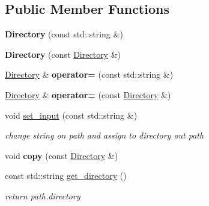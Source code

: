 \subsection*{Public Member Functions}
\begin{DoxyCompactItemize}
\item 
\mbox{\label{class_directory_a672adf44186f0a5b859681b858199060}} 
{\bfseries Directory} (const std\+::string \&)
\item 
\mbox{\label{class_directory_a1e6c830b4852be463ee627eaf2f4851e}} 
{\bfseries Directory} (const \mbox{\hyperlink{class_directory}{Directory}} \&)
\item 
\mbox{\label{class_directory_aa34f63559f0f4df446619cc3f8feeb4a}} 
\mbox{\hyperlink{class_directory}{Directory}} \& {\bfseries operator=} (const std\+::string \&)
\item 
\mbox{\label{class_directory_a83d6fc87791ff52071eabb7fd72c24fb}} 
\mbox{\hyperlink{class_directory}{Directory}} \& {\bfseries operator=} (const \mbox{\hyperlink{class_directory}{Directory}} \&)
\item 
\mbox{\label{class_directory_ad219c1eb86a1359c28e7fbfe34c45232}} 
void \mbox{\hyperlink{class_directory_ad219c1eb86a1359c28e7fbfe34c45232}{set\+\_\+input}} (const std\+::string \&)
\begin{DoxyCompactList}\small\item\em change string on path and assign to directory out path \end{DoxyCompactList}\item 
\mbox{\label{class_directory_a4cb94f24bee78cd0c1e50bad3f773b74}} 
void {\bfseries copy} (const \mbox{\hyperlink{class_directory}{Directory}} \&)
\item 
\mbox{\label{class_directory_a4c4d39af239f886cbbebae40b86d87db}} 
const std\+::string \mbox{\hyperlink{class_directory_a4c4d39af239f886cbbebae40b86d87db}{get\+\_\+directory}} ()
\begin{DoxyCompactList}\small\item\em return path.\+directory \end{DoxyCompactList}\item 

\end{DoxyCompactItemize}
